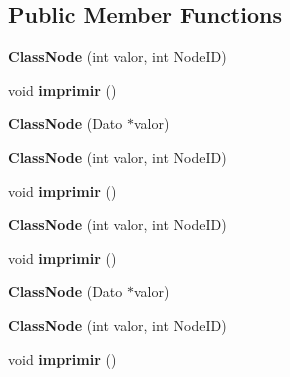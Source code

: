 \subsection*{Public Member Functions}
\begin{DoxyCompactItemize}
\item 
\mbox{\label{class_class_node_af5e8a5eb6fce7c605d34da8910bf856b}} 
{\bfseries Class\+Node} (int valor, int Node\+ID)
\item 
\mbox{\label{class_class_node_a36bbd63e5e501740dc69d84fff9df357}} 
void {\bfseries imprimir} ()
\item 
\mbox{\label{class_class_node_ac14b1ea4ba58bd16d53c2fdc0778bbda}} 
{\bfseries Class\+Node} (Dato $\ast$valor)
\item 
\mbox{\label{class_class_node_af5e8a5eb6fce7c605d34da8910bf856b}} 
{\bfseries Class\+Node} (int valor, int Node\+ID)
\item 
\mbox{\label{class_class_node_a36bbd63e5e501740dc69d84fff9df357}} 
void {\bfseries imprimir} ()
\item 
\mbox{\label{class_class_node_af5e8a5eb6fce7c605d34da8910bf856b}} 
{\bfseries Class\+Node} (int valor, int Node\+ID)
\item 
\mbox{\label{class_class_node_a36bbd63e5e501740dc69d84fff9df357}} 
void {\bfseries imprimir} ()
\item 
\mbox{\label{class_class_node_ac14b1ea4ba58bd16d53c2fdc0778bbda}} 
{\bfseries Class\+Node} (Dato $\ast$valor)
\item 
\mbox{\label{class_class_node_af5e8a5eb6fce7c605d34da8910bf856b}} 
{\bfseries Class\+Node} (int valor, int Node\+ID)
\item 
\mbox{\label{class_class_node_a36bbd63e5e501740dc69d84fff9df357}} 
void {\bfseries imprimir} ()
\end{DoxyCompactItemize}
